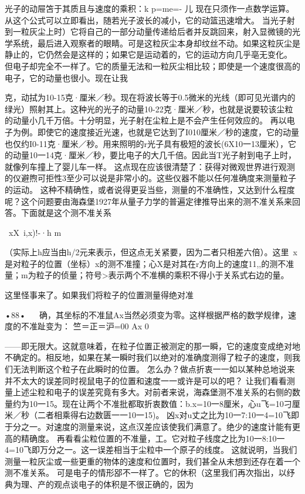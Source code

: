 光子的动屉笘于其质且与速度的乘积：k
p=me=-
儿
现在只须作一点数学运算。从这个公式可以立即看出，随若光子波长的减小，它的动篮迅速增大。
当光子射到一粒灰尘上时）它将自己的一部分动量传递给后者并反跳回来，射入显微镜的光学系统，最后进入观察者的眼睛。可是这粒灰尘本身却纹丝不动。如果这粒灰尘是静止的，它仍然会是这样的；如果它是运动着的，它的运动方向几乎亳无变化。
但电子却完全不一样了。它的质量无法和一粒灰尘相比较；即使是一个速度很高的电子，它的动量也很小。现在让我


克，动拭为10-15克·厘米／秒。现在将波长等于0.5微米的光线（即可见光谱内的绿光）照射其上。这种光的光子的动量10-22克·厘米／秒，也就是说要较该尘粒的动量小几千万倍。十分明显，光子射在尘粒上是不会产生任何效应的。
再以电子为例。即使它的速度接近光速，也就是它达到了I010厘米／秒的速度，它的动量也仅约I0-11克·厘米／秒。用来照明的r光子具有极短的波长(6X10一13厘米），它的动量10一14克·厘米／秒，要比电子的大几千倍。因此当T光子射到电子上时，就像列车撞上了婴儿车一样。
这点现在应该很清楚了：获得对微观世界进行观测的仪避煦可拒性3至少可以说是非常小的。这些仪器不能以任何准确度来测量粒子的运动。
这种不精确性，或者说得更妥当些，测量的不准确性，又达到什么程度呢？这个问题要由海森堡1927年从量子力学的普遍定律推导出来的测不准关系来回答。下面就是这个测不准关系

~xX~i,x)!-·h
m

（实际上h应当由h/2元来表示，但这点无关紧要，因为二者只相差六倍）。这里~x是对粒子的位置（坐标）x的测不准撞；心X是对其在r方向上的速度11,,的测不准量；m为粒子的侦量；符号>表示两个不准横的乘积不得小于关系式右边的量。

这里怪事来了。如果我们将粒子的位置测量得绝对准

•88•
  
确，其坐标的不准鼠Ax当然必须变为零。这样根据严格的数学规律，速度的不准趾变为：
竺＝正＝沪=00
	Ax	0

——即无限大。这就意味着，在粒子位置正被测定的那一瞬，它的速度变成绝对地不确定的。相反地，如果在某一瞬时我们以绝对的准确度测得了粒子的速度，则我们无法判断这个粒子在此瞬时的位置。
怎么办？做点折衷一一如以某种总地说来并不太大的误差同时视鼠电子的位置和速度一一或许是可以的吧？
让我们看看测量上述尘粒和电子的误差究竟有多大。对前者来说，海森堡测不准关系的右侧的数量约为10一15。现在让两个不准批都取折衷数值：b.x=10一8厘米，心u飞=10刁厘米／秒（二者相乘得右边数匮一一10一15)。
凶x对u丈之比为10一7:10一4=10飞即于分之一。对速度的测量来说，这点汉差应该使我们满意了。绝少的速度计能有更高的精确度。
再看看尘粒位置的不准量，工。它对粒子线度之比为10一8:10一4=10飞即万分之一。这一误差相当于尘粒中一个原子的线度。
这就说明，当我们测量一粒灰尘或一些更重的物体的速度和位置时，我们甚全从未想到还存在着一个测不准关系。
可是电子的情形郘不一样了。它的休积（这里我们再次指出，以纾典为理、产的观点谈电子的体积是不很正确的，因为

